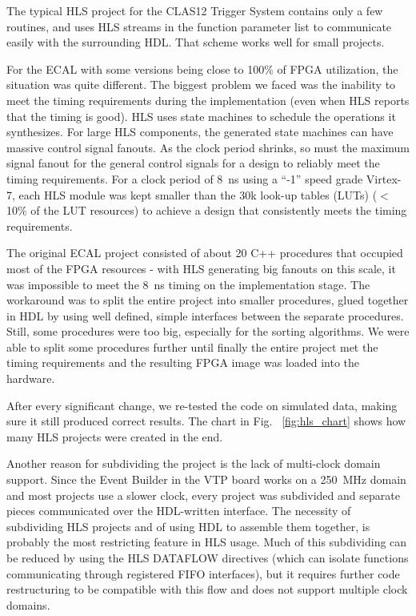 The typical HLS project for the CLAS12 Trigger System contains only a few routines, and uses HLS streams in the function parameter list to communicate easily with the surrounding HDL. That scheme works well for small projects.

For the ECAL with some versions being close to 100\% of FPGA utilization, the situation was quite different.
The biggest problem we faced was the inability to meet the timing requirements during the implementation (even when HLS reports that the timing is good). HLS uses state machines to schedule the operations it synthesizes. For large HLS components, the generated state machines can have massive control signal fanouts. As the clock period shrinks, so must the maximum signal fanout for the general control signals for a design to reliably meet the timing requirements. For a clock period of 8~ns using a ``-1'' speed grade Virtex-7, each HLS module was kept smaller than the 30k look-up tables (LUTs) ($<$10\% of the LUT resources) to achieve a design that consistently meets the timing requirements.

The original ECAL project consisted of about 20 C++ procedures that occupied most of the FPGA resources - with HLS generating big fanouts on this scale, it was impossible to meet the 8~ns timing on the implementation stage. The workaround was to split the entire project into smaller procedures, glued together in HDL by using well defined, simple interfaces between the separate procedures. Still, some procedures were too big, especially for the sorting algorithms. We were able to split some procedures further until finally the entire project met the timing requirements and the resulting FPGA image was loaded into the hardware.

After every significant change, we re-tested the code on simulated data, making sure it still produced correct results. The chart in Fig. ~\ref{fig:hls_chart} shows how many HLS projects were created in the end.

Another reason for subdividing the project is the lack of multi-clock domain support. Since the Event Builder in the VTP board works on a 250~MHz domain and most projects use a slower clock, every project was subdivided and separate pieces communicated over the HDL-written interface. The necessity of subdividing HLS projects and of using HDL to assemble them together, is probably the most restricting feature in HLS usage. Much of this subdividing can be reduced by using the HLS DATAFLOW directives (which can isolate functions communicating through registered FIFO interfaces), but it requires further code restructuring to be compatible with this flow and does not support multiple clock domains.

